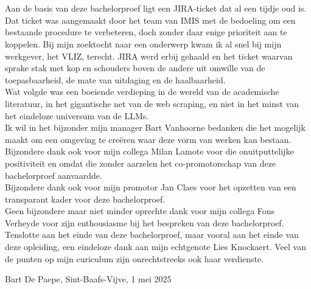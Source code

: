 
\chapter*{}%
\label{ch:voorwoord}


Aan de basis van deze bachelorproef ligt een JIRA-ticket dat al een tijdje oud is. Dat ticket was aangemaakt door het team van IMIS met de bedoeling om een bestaande procedure te verbeteren, doch zonder daar enige prioriteit aan te koppelen. Bij mijn zoektocht naar een onderwerp kwam ik al snel bij mijn werkgever, het VLIZ, terecht. JIRA werd erbij gehaald en het ticket waarvan sprake stak met kop en schouders boven de andere uit omwille van de toepasbaarheid, de mate van uitdaging en de haalbaarheid.\\
Wat volgde was een boeiende verdieping in de wereld van de academische literatuur, in het gigantische net van de web scraping, en niet in het minst van het eindeloze universum van de LLMs.\\
Ik wil in het bijzonder mijn manager Bart Vanhoorne bedanken die het mogelijk maakt om een omgeving te creëren waar deze vorm van werken kan bestaan.\\
Bijzondere dank ook voor mijn collega Milan Lamote voor die onuitputtelijke positiviteit en omdat die zonder aarzelen het co-promotorschap van deze bachelorproef aanvaardde.\\
Bijzondere dank ook voor mijn promotor Jan Claes voor het opzetten van een transparant kader voor deze bachelorproef.\\
Geen bijzondere maar niet minder oprechte dank voor mijn collega Fons Verheyde voor zijn enthousiasme bij het bespreken van deze bachelorproef.\\
Tenslotte aan het einde van deze bachelorproef, maar vooral aan het einde van deze opleiding, een eindeloze dank aan mijn echtgenote Lies Knockaert. Veel van de punten op mijn curiculum zijn onrechtstreeks ook haar verdienste.

Bart De Paepe,
Sint-Baafs-Vijve, 1 mei 2025